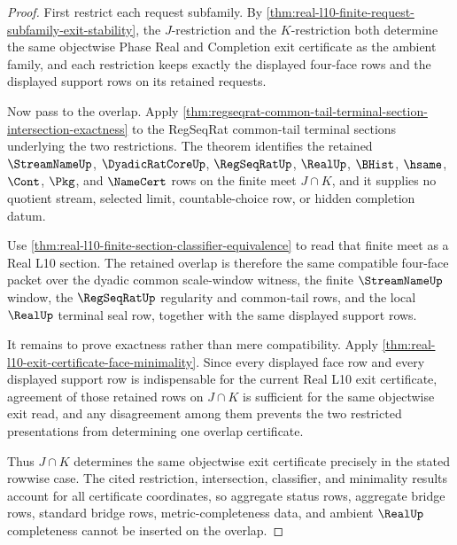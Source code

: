 \begin{proof}
First restrict each request subfamily. By \autoref{thm:real-l10-finite-request-subfamily-exit-stability}, the $J$-restriction and the $K$-restriction both determine the same objectwise Phase Real and Completion exit certificate as the ambient family, and each restriction keeps exactly the displayed four-face rows and the displayed support rows on its retained requests.

Now pass to the overlap. Apply \autoref{thm:regseqrat-common-tail-terminal-section-intersection-exactness} to the RegSeqRat common-tail terminal sections underlying the two restrictions. The theorem identifies the retained $\StreamNameUp$, $\DyadicRatCoreUp$, $\RegSeqRatUp$, $\RealUp$, $\BHist$, $\hsame$, $\Cont$, $\Pkg$, and $\NameCert$ rows on the finite meet $J \cap K$, and it supplies no quotient stream, selected limit, countable-choice row, or hidden completion datum.

Use \autoref{thm:real-l10-finite-section-classifier-equivalence} to read that finite meet as a Real L10 section. The retained overlap is therefore the same compatible four-face packet over the dyadic common scale-window witness, the finite $\StreamNameUp$ window, the $\RegSeqRatUp$ regularity and common-tail rows, and the local $\RealUp$ terminal seal row, together with the same displayed support rows.

It remains to prove exactness rather than mere compatibility. Apply \autoref{thm:real-l10-exit-certificate-face-minimality}. Since every displayed face row and every displayed support row is indispensable for the current Real L10 exit certificate, agreement of those retained rows on $J \cap K$ is sufficient for the same objectwise exit read, and any disagreement among them prevents the two restricted presentations from determining one overlap certificate.

Thus $J \cap K$ determines the same objectwise exit certificate precisely in the stated rowwise case. The cited restriction, intersection, classifier, and minimality results account for all certificate coordinates, so aggregate status rows, aggregate bridge rows, standard bridge rows, metric-completeness data, and ambient $\RealUp$ completeness cannot be inserted on the overlap.
\end{proof}


